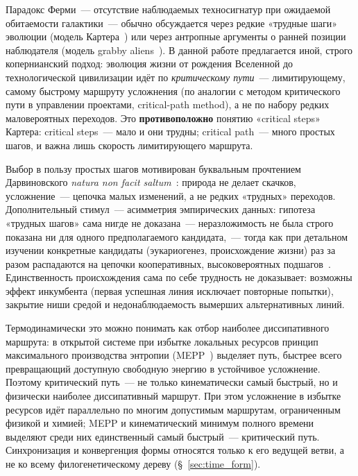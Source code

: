 \documentclass[12pt,a4paper]{article}
\begin{document}
Парадокс Ферми~--- отсутствие наблюдаемых техносигнатур при ожидаемой обитаемости галактики~--- обычно обсуждается через редкие «трудные шаги» эволюции (модель Картера~\cite{Carter1983}) или через антропные аргументы о ранней позиции наблюдателя (модель grabby aliens~\cite{Hanson2021}). В данной работе предлагается иной, строго копернианский подход: эволюция жизни от рождения Вселенной до технологической цивилизации идёт по \emph{критическому пути}~--- лимитирующему, самому быстрому маршруту усложнения (по аналогии с методом критического пути в управлении проектами, critical-path method), а не по набору редких маловероятных переходов. Это \textbf{противоположно} понятию «critical steps» Картера: critical steps~--- мало и они трудны; critical path~--- много простых шагов, и важна лишь скорость лимитирующего маршрута.

Выбор в пользу простых шагов мотивирован буквальным прочтением Дарвиновского \emph{natura non facit saltum}~\cite{Darwin1859}: природа не делает скачков, усложнение~--- цепочка малых изменений, а не редких «трудных» переходов. Дополнительный стимул~--- асимметрия эмпирических данных: гипотеза «трудных шагов» сама нигде не доказана~--- неразложимость не была строго показана ни для одного предполагаемого кандидата,~--- тогда как при детальном изучении конкретные кандидаты (эукариогенез, происхождение жизни) раз за разом распадаются на цепочки кооперативных, высоковероятных подшагов~\cite{Mills2025}. Единственность происхождения сама по себе трудность не доказывает: возможны эффект инкумбента (первая успешная линия исключает повторные попытки), закрытие ниши средой и недонаблюдаемость вымерших альтернативных линий.

Термодинамически это можно понимать как отбор наиболее диссипативного маршрута: в открытой системе при избытке локальных ресурсов принцип максимального производства энтропии (MEPP~\cite{Martyushev,MartyushevSeleznev2006,Kleidon2010,Vallino2010}) выделяет путь, быстрее всего превращающий доступную свободную энергию в устойчивое усложнение. Поэтому критический путь~--- не только кинематически самый быстрый, но и физически наиболее диссипативный маршрут. При этом усложнение в избытке ресурсов идёт параллельно по многим допустимым маршрутам, ограниченным физикой и химией; MEPP и кинематический минимум полного времени выделяют среди них единственный самый быстрый~--- критический путь. Синхронизация и конвергенция формы относятся только к его ведущей ветви, а не ко всему филогенетическому дереву (\S~\ref{sec:time_form}).
\end{document}

